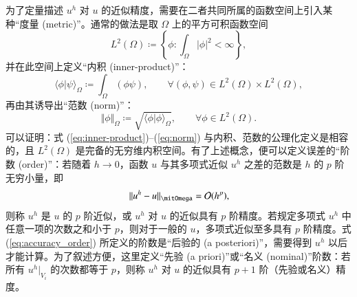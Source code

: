 为了定量描述 $u^{h}$ 对 $u$ 的近似精度，需要在二者共同所属的函数空间上引入某种“度量 (metric)”。通常的做法是取
$\varOmega$ 上的平方可积函数空间
\begin{equation}
L^{2}(\varOmega)\coloneqq\left\{ \phi:\int_{\varOmega}\vert\phi\vert^{2}<\infty\right\} ,\label{eq:L2-space}
\end{equation}
并在此空间上定义“内积 (inner-product)”：
\begin{equation}
\langle\phi\vert\psi\rangle_{\varOmega}\coloneqq\int_{\varOmega}(\phi\psi),\qquad\forall(\phi,\psi)\in L^{2}(\varOmega)\times L^{2}(\varOmega),\label{eq:inner-product}
\end{equation}
再由其诱导出“范数 (norm)”：
\begin{equation}
\Vert\phi\Vert_{\varOmega}\coloneqq\sqrt{\langle\phi\vert\phi\rangle_{\varOmega}},\qquad\forall\phi\in L^{2}(\varOmega).\label{eq:norm}
\end{equation}
可以证明：式 (\ref{eq:inner-product})–(\ref{eq:norm}) 与内积、范数的公理化定义是相容的，且
$L^{2}(\varOmega)$ 是完备的无穷维内积空间。有了上述概念，便可以定义误差的“阶数 (order)”：若随着 $h\to0$，函数
$u$ 与其多项式近似 $u^{h}$ 之差的范数是 $h$ 的 $p$ 阶无穷小量，即
\begin{equation}
\Vert u^{h}-u\Vert_{\varOmega}=\order{h^{p}},\label{eq:accuracy_order}
\end{equation}
则称 $u^{h}$ 是 $u$ 的 $p$ 阶近似，或 $u^{h}$ 对 $u$ 的近似具有 $p$ 阶精度。若规定多项式
$u^{h}$ 中任意一项的次数之和小于 $p$，则对于一般的 $u$，多项式近似至多具有 $p$ 阶精度。式 (\ref{eq:accuracy_order})
所定义的阶数是“后验的 (a posteriori)”，需要得到 $u^{h}$ 以后才能计算。为了叙述方便，这里定义“先验 (a
priori)”或“名义 (nominal)”阶数：若所有 $u^{h}|_{V_{i}}$ 的次数都等于 $p$，则称 $u^{h}$
对 $u$ 的近似具有 $p+1$ 阶（先验或名义）精度。

